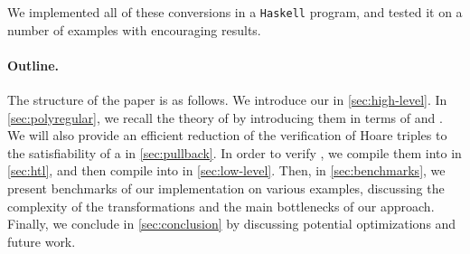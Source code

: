 We implemented all of these conversions in a \texttt{Haskell} program, and
tested it on a number of examples with encouraging results. 


\paragraph{Outline.} The structure of the paper is as follows. We introduce our
 in \cref{sec:high-level}. In \cref{sec:polyregular},
we recall the theory of  by introducing them in terms
of  and . We will also
provide an efficient reduction of the verification of Hoare triples to the
satisfiability of a  in \cref{sec:pullback}.
In order to verify , we compile them into  in \cref{sec:htl}, and then compile  into
 in \cref{sec:low-level}. 
%
Then, in \cref{sec:benchmarks}, we present
benchmarks of our implementation on various examples, discussing
the complexity of the transformations and the main bottlenecks of our approach.
Finally, we conclude in \cref{sec:conclusion} by discussing potential
optimizations and future work.

